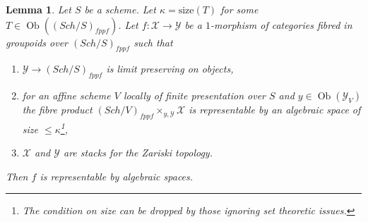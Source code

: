 \documentclass{stacks-project}
\theoremstyle{plain}
\newtheorem{lemma}[subsection]{Lemma}
\theoremstyle{definition}
\theoremstyle{remark}
\numberwithin{equation}{subsection}
\def\Sch{\mathit{Sch}}
\def\Ob{\mathop{\mathrm{Ob}}\nolimits}
\begin{document}
\begin{lemma}
\label{lemma-check-representable-limit-preserving}
Let $S$ be a scheme.
Let $\kappa = \text{size}(T)$ for some $T \in \Ob((\Sch/S)_{fppf})$.
Let $f : \mathcal{X} \to \mathcal{Y}$ be a $1$-morphism
of categories fibred in groupoids over $(\Sch/S)_{fppf}$
such that
\begin{enumerate}
\item $\mathcal{Y} \to (\Sch/S)_{fppf}$ is limit preserving on objects,
\item for an affine scheme $V$ locally of finite presentation over $S$ and
$y \in \Ob(\mathcal{Y}_V)$ the fibre product
$(\Sch/V)_{fppf} \times_{y, \mathcal{Y}} \mathcal{X}$ is representable
by an algebraic space of size $\leq \kappa$\footnote{The condition on
size can be dropped by those ignoring set theoretic issues.},
\item $\mathcal{X}$ and $\mathcal{Y}$ are stacks for the Zariski topology.
\end{enumerate}
Then $f$ is representable by algebraic spaces.
\end{lemma}
\end{document}
